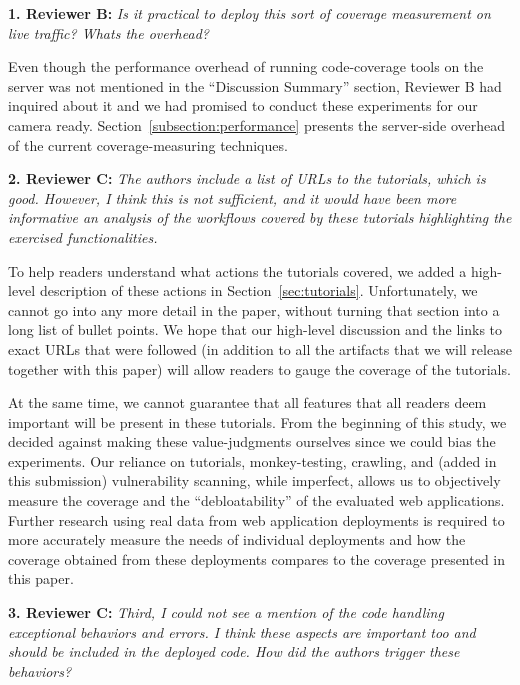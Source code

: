 \noindent \textbf{1. Reviewer B:} \textit{Is it practical to deploy this sort of coverage measurement on live traffic? Whats the overhead?}
\vspace{0.5ex}

\noindent Even though the performance overhead of running code-coverage tools on the server was not mentioned in the ``Discussion Summary'' section, Reviewer B had inquired about it and we had promised to conduct these experiments for our camera ready. Section~\ref{subsection:performance} presents the server-side overhead of the current coverage-measuring techniques.

\vspace{1ex}


\noindent \textbf{2. Reviewer C:} \textit{The authors include a list of URLs to the tutorials, which is good. However, I think this is not sufficient, and it would have been more informative an analysis of the workflows covered by these tutorials highlighting the exercised functionalities.}
\vspace{0.5ex}

\noindent To help readers understand what actions the tutorials covered, we added a high-level description of these actions in Section~\ref{sec:tutorials}. Unfortunately, we cannot go into any more detail in the paper, without turning that section into a long list of bullet points. We hope that our high-level discussion and the links to exact URLs that were followed (in addition to all the artifacts that we will release together with this paper) will allow readers to gauge the coverage of the tutorials.

At the same time, we cannot guarantee that all features that all readers deem important will be present in these tutorials. From the beginning of this study, we decided against making these value-judgments ourselves since we could bias the experiments. Our reliance on tutorials, monkey-testing, crawling, and (added in this submission) vulnerability scanning, while imperfect, allows us to objectively measure the coverage and the ``debloatability'' of the evaluated web applications. Further research using real data from web application deployments is required to more accurately measure the needs of individual deployments and how the coverage obtained from these deployments compares to the coverage presented in this paper.

\vspace{1ex}

\noindent \textbf{3. Reviewer C:} \textit{Third, I could not see a mention of the code handling exceptional behaviors and errors. I think these aspects are important too and should be included in the deployed code. How did the authors trigger these behaviors?}
\vspace{0.5ex}

